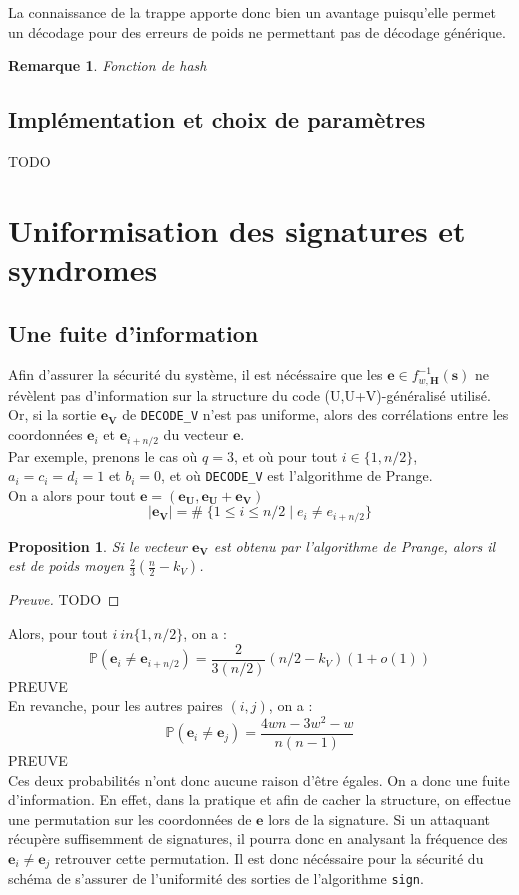 \documentclass[12pt]{article}
\theoremstyle{plain}
\newtheorem{remarque}[thm]{Remarque}
\newtheorem{propo}[thm]{Proposition}
\begin{document}
La connaissance de la trappe apporte donc bien un avantage puisqu'elle permet un décodage pour des erreurs de poids ne permettant pas de décodage générique. 

\begin{remarque} Fonction de hash
\end{remarque}

\subsection{Implémentation et choix de paramètres}
TODO \\
\section{Uniformisation des signatures et syndromes}

\subsection{Une fuite d'information}
Afin d'assurer la sécurité du système, il est nécéssaire que les $\mathbf{e} \in f_{w,\mathbf{H}}^{-1}(\mathbf{s})$ ne révèlent pas d'information sur la structure du code (U,U+V)-généralisé utilisé. \\
Or, si la sortie $\mathbf{e_V}$ de \verb|DECODE_V| n'est pas uniforme, alors des corrélations entre les coordonnées $\mathbf{e}_i$ et $\mathbf{e}_{i+n/2}$ du vecteur $\mathbf{e}$. \\
Par exemple, prenons le cas où $q=3$, et où pour tout $i \in \{1,n/2\}$, $a_i = c_i = d_i = 1$ et $b_i = 0$, et où \verb|DECODE_V| est l'algorithme de Prange. \\
On a alors pour tout $\mathbf{e} = (\mathbf{e_U},\mathbf{e_U}+\mathbf{e_V})$
$$ |\mathbf{e_V}| = \# \; \{1  \leq i \leq n/2 \;|\; e_i \neq e_{i+n/2}\}$$

\begin{propo}
Si le vecteur $\mathbf{e_V}$ est obtenu par l'algorithme de Prange, alors il est de poids moyen $\frac{2}{3}(\frac{n}{2}-k_V)$.
\end{propo}

\begin{proof}[Preuve]
TODO
\end{proof}

Alors, pour tout $i \ in \{1,n/2\}$, on a :
$$ \mathbb{P}(\mathbf{e}_i \neq \mathbf{e}_{i+n/2}) = \frac{2}{3(n/2)}(n/2-k_V)(1+o(1))$$
PREUVE \\
En revanche, pour les autres paires $(i,j)$, on a :
$$ \mathbb{P}(\mathbf{e}_i \neq \mathbf{e}_{j}) = \frac{4wn - 3w^2-w}{n(n-1)}$$
PREUVE \\
Ces deux probabilités n'ont donc aucune raison d'être égales. On a donc une fuite d'information. En effet, dans la pratique et afin de cacher la structure, on effectue une permutation sur les coordonnées de $\mathbf{e}$ lors de la signature. Si un attaquant récupère suffisemment de signatures, il pourra donc en analysant la fréquence des $\mathbf{e}_i \neq \mathbf{e}_j$ retrouver cette permutation. Il est donc nécéssaire pour la sécurité du schéma de s'assurer de l'uniformité des sorties de l'algorithme \verb|sign|.
\end{document}
